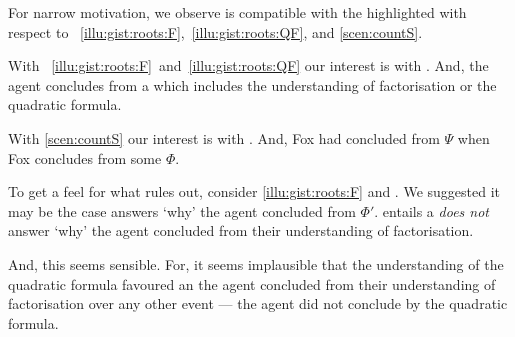 \begin{note}
  For narrow motivation, we observe \issueInclusion{} is compatible with the  highlighted with respect to ~\ref{illu:gist:roots:F},~\ref{illu:gist:roots:QF}, and \ref{scen:countS}.

  With ~\ref{illu:gist:roots:F}~and~\ref{illu:gist:roots:QF} our interest is with .
  And, the agent concludes  from a \pool{} which includes the \agents{} understanding of factorisation or the quadratic formula.

  With \autoref{scen:countS} our interest is with .
  And, Fox had concluded  from \(\Psi\) when Fox concludes  from some \pool{} \(\Phi\).
\end{note}


\begin{note}
  To get a feel for what \issueInclusion{} rules out, consider \autoref{illu:gist:roots:F} and .
  We suggested it may be the case  answers `why' the agent concluded  from \(\Phi'\).
  \issueInclusion{} entails a  \emph{does not} answer `why' the agent concluded  from their understanding of factorisation.

  And, this seems sensible.
  For, it seems implausible that the \agents{} understanding of the quadratic formula favoured an  the agent concluded  from their understanding of factorisation over any other event --- the agent did not conclude by the quadratic formula.
\end{note}


